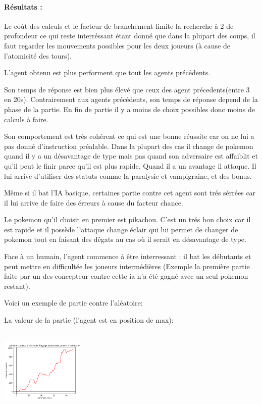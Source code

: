 			\paragraph{Résultats :}
			    Le coût des calculs et le facteur de branchement limite la recherche à 2 de profondeur ce qui reste interréssant étant donné que dans la plupart des coups, il faut regarder les mouvements possibles pour les deux joueurs (à cause de l'atomicité des tours).
			    
			    L'agent obtenu est plus performent que tout les agents précédents.
			    
			    Son temps de réponse est bien plus élevé que ceux des agent précedents(entre 3 en 20s).
			    Contrairement aux agents précédents, son temps de réponse depend de la phase de la partie. En fin de partie il y a moins de choix possibles donc moins de calculs à faire.
			    
			    Son comportement est trés cohérent ce qui est une bonne réussite car on ne lui a pas donné d'instruction préalable. Dans la plupart des cas il change de pokemon quand il y a un désavantage de type mais pas quand son adversaire est affaiblit et qu'il peut le finir parce qu'il est plus rapide. Quand il a un avantage il attaque. Il lui arrive d'utiliser des statuts comme la paralysie et vampigraine, et des bonus.
			    
			    Même si il bat l'IA basique, certaines partie contre cet agent sont trés sérrées car il lui arrive de faire des érreurs à cause du facteur chance.
			    
			    Le pokemon qu'il choisit en premier est pikachou. C'est un trés bon choix car il est rapide et il possède l'attaque change éclair qui lui permet de changer de pokemon tout en faisant des dêgats au cas où il serait en désavantage de type.
			    
			    Face à un humain, l'agent commence à être interressant : il bat les débutants et peut mettre en difficultée les joueurs intermédières (Exemple la première partie faite par un des concepteur contre cette ia n'a été gagné avec un seul pokemon restant).
			    
			    Voici un exemple de partie contre l'aléatoire:
			    
			    La valeur de la partie (l'agent est en position de max):
			    
			    \includegraphics[width=4cm,height=4cm]{graphiques/valeur_alphbet_alea1}
			    
